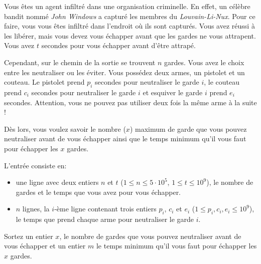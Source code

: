 

Vous êtes un agent infiltré dans une organisation criminelle. En effet, un célèbre bandit nommé \textit{John Windows} a capturé les membres du \textit{Louvain-Li-Nux}. Pour ce faire, vous vous êtes infiltré dans l'endroit où ils sont capturés. Vous avez réussi à les libérer, mais vous devez vous échapper avant que les gardes ne vous attrapent.  Vous avez $t$ secondes pour vous échapper avant d'être attrapé.

Cependant, sur le chemin de la sortie se trouvent $n$ gardes. Vous avez le choix entre les neutraliser ou les éviter. Vous possédez deux armes, un pistolet et un couteau. Le pistolet prend $p_i$ secondes pour neutraliser le garde $i$, le couteau prend $c_i$ secondes pour neutraliser le garde $i$ et esquiver le garde $i$ prend $e_i$ secondes. Attention, vous ne pouvez pas utiliser deux fois la même arme à la suite !

Dès lors, vous voulez savoir le nombre ($x$) maximum de garde que vous pouvez neutraliser avant de vous échapper ainsi que le temps minimum qu'il vous faut pour échapper les $x$ gardes.
\begin{Input}
    L'entrée consiste en:
    \begin{itemize}
        \item une ligne avec deux entiers $n$ et $t$ ($1\leq n \leq 5 \cdot 10^5$, $1\leq t \leq 10^9$), le nombre de gardes et le temps que vous avez pour vous échapper.
        \item $n$ lignes, la $i$-ème ligne contenant trois entiers  $p_i$, $c_i$ et $e_i$ ($1\leq p_i, c_i, e_i \leq 10^9$), le temps que prend chaque arme pour neutraliser le garde $i$.
    \end{itemize}
\end{Input}

\begin{Output}
    Sortez un entier $x$, le nombre de gardes que vous pouvez neutraliser avant de vous échapper et un entier $m$ le temps minimum qu'il vous faut pour échapper les $x$ gardes.
\end{Output}
